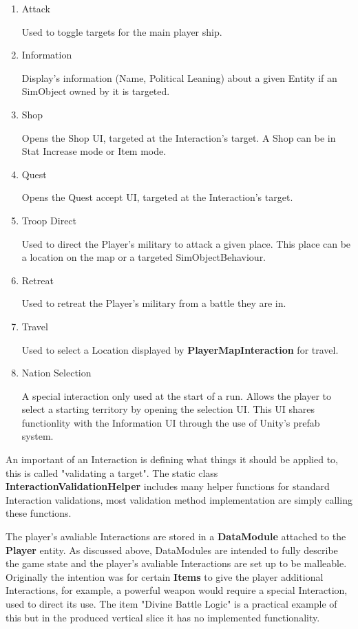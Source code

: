 \documentclass{report}
\begin{document}
\begin{enumerate}

	\item Attack

	Used to toggle targets for the main player ship.

	\item Information
	
	Display's information (Name, Political Leaning) about a given Entity if an SimObject owned by it is targeted.

	\item Shop

	Opens the Shop UI, targeted at the Interaction's target. A Shop can be in Stat Increase mode or Item mode.

	\item Quest

	Opens the Quest accept UI,  targeted at the Interaction's target.

	\item Troop Direct

	Used to direct the Player's military to attack a given place. This place can be a location on the map or a targeted SimObjectBehaviour.

	\item Retreat
	
	Used to retreat the Player's military from a battle they are in.

	\item Travel

	Used to select a Location displayed by \textbf{PlayerMapInteraction} for travel.

	\item Nation Selection

	A special interaction only used at the start of a run. Allows the player to select a starting territory by opening the selection UI. This UI shares functionlity with the Information UI through the use of Unity's prefab system.

\end{enumerate}

An important of an Interaction is defining what things it should be applied to, this is called "validating a target". The static class \textbf{InteractionValidationHelper} includes many helper functions for standard Interaction validations, most validation method implementation are simply calling these functions. 

The player's avaliable Interactions are stored in a \textbf{DataModule} attached to the \textbf{Player} entity. As discussed above, DataModules are intended to fully describe the game state and the player's avaliable Interactions are set up to be malleable. Originally the intention was for certain \textbf{Items} to give the player additional Interactions, for example, a powerful weapon would require a special Interaction, used to direct its use. The item "Divine Battle Logic" is a practical example of this but in the produced vertical slice it has no implemented functionality.
\end{document}
